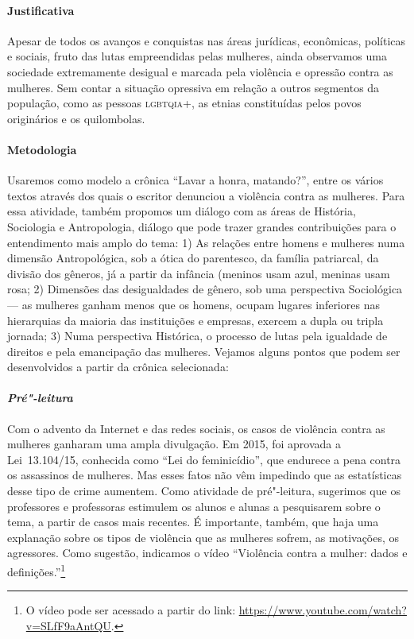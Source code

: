\documentclass[11pt]{extarticle}
\begin{document}
\paragraph{Justificativa} Apesar de todos os avanços e conquistas nas
áreas jurídicas, econômicas, políticas e sociais, fruto das lutas
empreendidas pelas mulheres, ainda observamos uma sociedade extremamente
desigual e marcada pela violência e opressão contra as mulheres. Sem
contar a situação opressiva em relação a outros segmentos da população, 
como as pessoas \textsc{lgbtqia}+, as etnias constituídas pelos povos
originários e os quilombolas.

\paragraph{Metodologia} Usaremos como modelo a crônica ``Lavar
a honra, matando?'', entre os vários textos através dos quais o escritor
denunciou a violência contra as mulheres. Para essa atividade, também
propomos um diálogo com as áreas de História, Sociologia e Antropologia,
diálogo que pode trazer grandes contribuições para o entendimento mais
amplo do tema: 1) As relações entre homens e mulheres numa dimensão
Antropológica, sob a ótica do parentesco, da família patriarcal, da
divisão dos gêneros, já a partir da infância (meninos usam azul, meninas
usam rosa; 2) Dimensões das desigualdades de gênero, sob uma perspectiva
Sociológica --- as mulheres ganham menos que os homens, ocupam lugares
inferiores nas hierarquias da maioria das instituições e empresas,
exercem a dupla ou tripla jornada; 3) Numa perspectiva Histórica, o
processo de lutas pela igualdade de direitos e pela emancipação das
mulheres. Vejamos alguns pontos que podem ser desenvolvidos a partir da
crônica selecionada:

\paragraph{\textit{Pré"-leitura}}

Com o advento da Internet e das redes sociais, os casos de violência
contra as mulheres ganharam uma ampla divulgação. Em 2015, foi aprovada
a Lei~13.104/15, conhecida como ``Lei do feminicídio'', que endurece a
pena contra os assassinos de mulheres. Mas esses fatos não vêm impedindo
que as estatísticas desse tipo de crime aumentem. Como atividade de
pré"-leitura, sugerimos que os professores e professoras estimulem os
alunos e alunas a pesquisarem sobre o tema, a partir de casos mais recentes.
É importante, também, que haja uma explanação sobre os tipos de violência
que as mulheres sofrem, as motivações, os agressores. Como sugestão,
indicamos o vídeo ``Violência contra a mulher: dados e
definições.''\footnote{O vídeo pode ser acessado a partir do link:
  \url{https://www.youtube.com/watch?v=SLfF9aAntQU}.}
\end{document}
